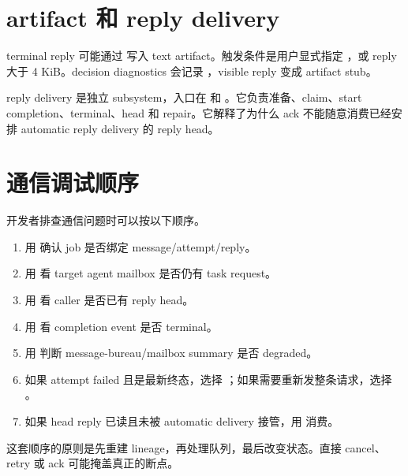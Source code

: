 \section{artifact 和 reply delivery}

terminal reply 可能通过  写入 text artifact。触发条件是用户显式指定 ，或 reply 大于 4 KiB。decision diagnostics 会记录 ，visible reply 变成 artifact stub。

reply delivery 是独立 subsystem，入口在  和 。它负责准备、claim、start completion、terminal、head 和 repair。它解释了为什么 ack 不能随意消费已经安排 automatic reply delivery 的 reply head。

\section{通信调试顺序}

开发者排查通信问题时可以按以下顺序。

\begin{enumerate}
  \item 用  确认 job 是否绑定 message/attempt/reply。
  \item 用  看 target agent mailbox 是否仍有 task request。
  \item 用  看 caller 是否已有 reply head。
  \item 用  看 completion event 是否 terminal。
  \item 用  判断 message-bureau/mailbox summary 是否 degraded。
  \item 如果 attempt failed 且是最新终态，选择 ；如果需要重新发整条请求，选择 。
  \item 如果 head reply 已读且未被 automatic delivery 接管，用  消费。
\end{enumerate}

这套顺序的原则是先重建 lineage，再处理队列，最后改变状态。直接 cancel、retry 或 ack 可能掩盖真正的断点。
